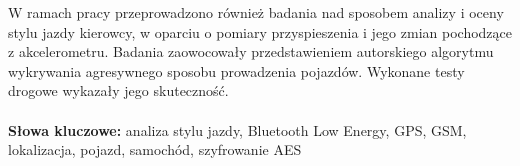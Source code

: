 \begin{singlespacing}
W ramach pracy przeprowadzono również badania nad sposobem analizy i oceny stylu jazdy kierowcy, w oparciu o pomiary przyspieszenia i jego zmian pochodzące z akcelerometru. Badania zaowocowały przedstawieniem autorskiego algorytmu wykrywania agresywnego sposobu prowadzenia pojazdów. Wykonane  testy drogowe wykazały jego skuteczność. \\

\textbf{\\Słowa kluczowe: }analiza stylu jazdy, Bluetooth Low Energy, GPS, GSM, lokalizacja, pojazd, samochód, szyfrowanie AES

\end{singlespacing}

\cleardoublepage
\thispagestyle{empty}

\\


\\

